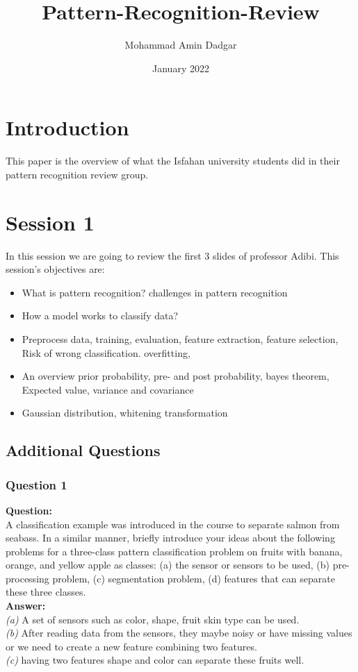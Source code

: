\documentclass{article}
\title{Pattern-Recognition-Review}
\author{Mohammad Amin Dadgar}
\date{January 2022}
\begin{document}
\maketitle

\tableofcontents
\newpage


\section{Introduction}
This paper is the overview of what the Isfahan university students did in their pattern recognition review group. 


\section{Session 1}
In this session we are going to review the first 3 slides of professor Adibi. This session's objectives are:
\begin{itemize}
    \item What is pattern recognition? challenges in pattern recognition
    \item How a model works to classify data?
    \item Preprocess data, training, evaluation, feature extraction, feature selection, Risk of wrong classification. overfitting, 
    \item An overview prior probability, pre- and post probability, bayes theorem, Expected value, variance and covariance
    \item Gaussian distribution, whitening transformation
\end{itemize}


\subsection{Additional Questions}
\subsubsection{Question 1}
\textbf{Question:} \\
A classification example was introduced in the course to separate salmon from
seabass. In a similar manner, briefly introduce your ideas about the following
problems for a three-class pattern classification problem on fruits with banana,
orange, and yellow apple as classes: (a) the sensor or sensors to be used, (b) pre-
processing problem, (c) segmentation problem, (d) features that can separate these
three classes. \\ 
\textbf{Answer:} \\
\textit{(a)} A set of sensors such as color, shape, fruit skin type can be used. \\
\textit{(b)}  After reading data from the sensors, they maybe noisy or have missing values or we need to create a new feature combining two features. \\
\textit{(c)} having two features shape and color can separate these fruits well.
\end{document}
